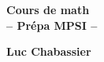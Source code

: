 \begin{titlepage}
\vspace*{0.25\linewidth}
\parindent=0pt
\hrulefill
\begin{center}\bfseries\Huge
Cours de math\\-- Prépa MPSI --
\end{center}
\hrulefill
\vspace*{1cm}
\begin{center}\bfseries\Large
Luc Chabassier
\end{center}
\restoregeometry
\end{titlepage}

